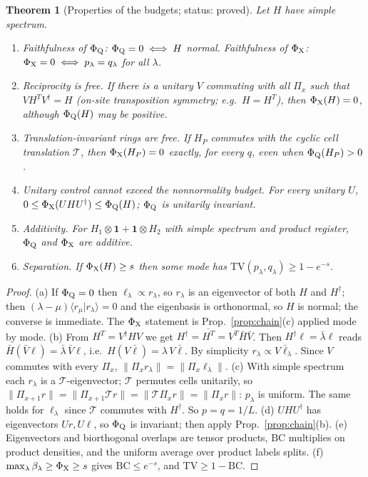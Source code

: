 \documentclass[11pt]{article}
\newtheorem{theorem}{Theorem}
\newcommand{\id}{\mathbf{1}}
\newcommand{\PhiQ}{\Phi_{\rm Q}}
\newcommand{\PhiX}{\Phi_{\rm X}}
\newcommand{\BC}{\mathrm{BC}}
\newcommand{\ip}[2]{\langle #1|#2\rangle}
\begin{document}
\begin{theorem}[Properties of the budgets; status: proved]\label{thm:props}
Let $H$ have simple spectrum.
\begin{enumerate}
\item[(a)] \emph{Faithfulness of $\PhiQ$:} $\PhiQ=0\iff H$ normal. \emph{Faithfulness of $\PhiX$:} $\PhiX=0\iff p_\lambda=q_\lambda$ for all $\lambda$.
\item[(b)] \emph{Reciprocity is free.} If there is a unitary $V$ commuting with all $\Pi_x$ such that $VH^{T}V^\dagger=H$ (on-site transposition symmetry; e.g.\ $H=H^T$), then $\PhiX(H)=0$, although $\PhiQ(H)$ may be positive.
\item[(c)] \emph{Translation-invariant rings are free.} If $H_P$ commutes with the cyclic cell translation $\mathcal T$, then $\PhiX(H_P)=0$ exactly, for every $q$, even when $\PhiQ(H_P)>0$.
\item[(d)] \emph{Unitary control cannot exceed the nonnormality budget.} For every unitary $U$, $0\le\PhiX(UHU^\dagger)\le\PhiQ(H)$; $\PhiQ$ is unitarily invariant.
\item[(e)] \emph{Additivity.} For $H_1\otimes\id+\id\otimes H_2$ with simple spectrum and product register, $\PhiQ$ and $\PhiX$ are additive.
\item[(f)] \emph{Separation.} If $\PhiX(H)\ge s$ then some mode has $\mathrm{TV}(p_\lambda,q_\lambda)\ge1-e^{-s}$.
\end{enumerate}
\end{theorem}
\begin{proof}
(a) If $\PhiQ=0$ then $\ell_\lambda\propto r_\lambda$, so $r_\lambda$ is an eigenvector of both $H$ and $H^\dagger$; then $(\lambda-\mu)\ip{r_\mu}{r_\lambda}=0$ and the eigenbasis is orthonormal, so $H$ is normal; the converse is immediate. The $\PhiX$ statement is Prop.~\ref{prop:chain}(c) applied mode by mode.
(b) From $H^T=V^\dagger HV$ we get $H^\dagger=\overline{H^T}=V^T\bar H\bar V$. Then $H^\dagger\ell=\bar\lambda\ell$ reads $\bar H(\bar V\ell)=\bar\lambda\,\bar V\ell$, i.e.\ $H(V\bar\ell)=\lambda\,V\bar\ell$. By simplicity $r_\lambda\propto V\bar\ell_\lambda$. Since $V$ commutes with every $\Pi_x$, $\|\Pi_xr_\lambda\|=\|\Pi_x\ell_\lambda\|$.
(c) With simple spectrum each $r_\lambda$ is a $\mathcal T$-eigenvector; $\mathcal T$ permutes cells unitarily, so $\|\Pi_{x+1}r\|=\|\Pi_{x+1}\mathcal Tr\|=\|\mathcal T\Pi_xr\|=\|\Pi_xr\|$: $p_\lambda$ is uniform. The same holds for $\ell_\lambda$ since $\mathcal T$ commutes with $H^\dagger$. So $p=q=1/L$.
(d) $UHU^\dagger$ has eigenvectors $Ur,U\ell$, so $\PhiQ$ is invariant; then apply Prop.~\ref{prop:chain}(b).
(e) Eigenvectors and biorthogonal overlaps are tensor products, $\BC$ multiplies on product densities, and the uniform average over product labels splits.
(f) $\max_\lambda\beta_\lambda\ge\PhiX\ge s$ gives $\BC\le e^{-s}$, and $\mathrm{TV}\ge1-\BC$.
\end{proof}
\end{document}

